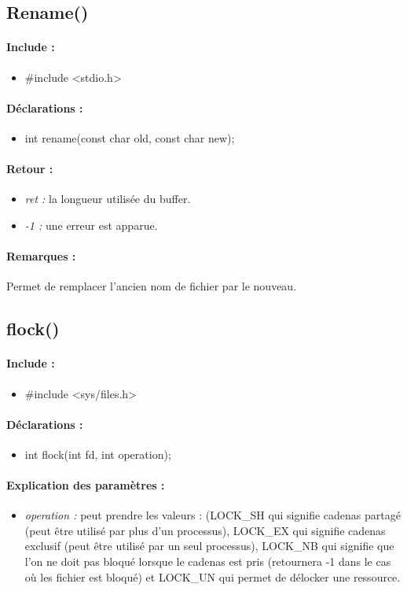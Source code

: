 \documentclass{article}[12pt]
\begin{document}
\subsection{Rename()}
\paragraph{Include : }
\begin{itemize}
	\item \#include <stdio.h>
\end{itemize}
\paragraph{Déclarations : }
\begin{itemize}
	\item int rename(const char \* old, const char \* new);
\end{itemize}
\paragraph{Retour : }
\begin{itemize}
	\item \emph{ret : } la longueur utilisée du buffer. 
	\item \emph{-1 : } une erreur est apparue.
\end{itemize}
\paragraph{Remarques : }
Permet de remplacer l'ancien nom de fichier par le nouveau.
\subsection{flock()}
\paragraph{Include : }
\begin{itemize}
	\item \#include <sys/files.h>
\end{itemize}
\paragraph{Déclarations : }
\begin{itemize}
	\item int flock(int fd, int operation);
\end{itemize}
\paragraph{Explication des paramètres : }
\begin{itemize}
	\item \emph{operation : } peut prendre les valeurs : (LOCK\_SH qui signifie cadenas partagé (peut être utilisé par plus d'un processus), LOCK\_EX qui signifie cadenas exclusif (peut être utilisé par un seul processus), LOCK\_NB qui signifie que l'on ne doit pas bloqué lorsque le cadenas est pris (retournera -1 dans le cas où les fichier est bloqué) et LOCK\_UN qui permet de délocker une ressource. 
\end{itemize}
\end{document}
